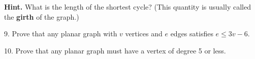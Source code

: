 \documentclass[12pt,]{book}
\newcommand{\terminology}[1]{\textbf{#1}}
\theoremstyle{plain}
\theoremstyle{definition}
\theoremstyle{definition}
\theoremstyle{definition}
\numberwithin{equation}{chapter}
\begin{document}
\begin{exerciselist}
{%
}%
\par\smallskip
\par\smallskip%
\noindent\textbf{Hint.}\hypertarget{hint-12}{}\quad%
\hypertarget{p-1670}{}%
What is the length of the shortest cycle?  (This quantity is usually called the \terminology{girth} of the graph.)%
\item[9.]\hypertarget{exercise-193}{}\hypertarget{p-1671}{}%
Prove that any planar graph with \(v\) vertices and \(e\) edges satisfies \(e \le 3v - 6\).%
\par\smallskip
\item[10.]\hypertarget{exercise-194}{}\hypertarget{p-1673}{}%
Prove that any planar graph must have a vertex of degree 5 or less.%
\par\smallskip
\end{exerciselist}
\typeout{************************************************}
\typeout{************************************************}
\end{document}
